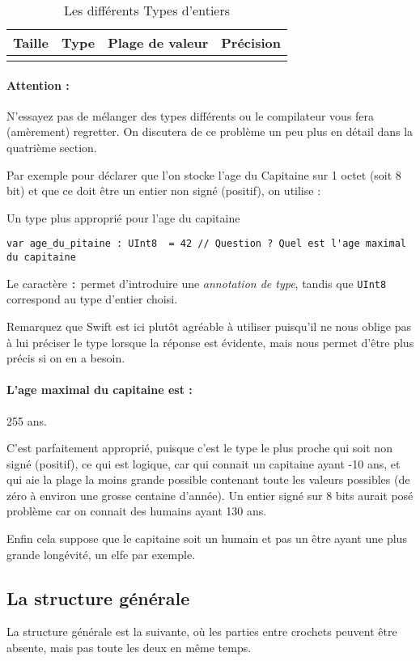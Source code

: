 \begin{longtabu} to \linewidth {|X[3,l,m]|X[1.5,l,m]|X[6,r,m]|X[1,r,m]|}
\hline Taille & Type & Plage de valeur & Précision \\ \hline
\endhead

\caption{Les différents Types d'entiers}
\end{longtabu}

\paragraph{Attention :}
N'essayez pas de mélanger des types différents ou
le compilateur vous fera (amèrement) regretter.
On discutera de ce problème un peu plus en détail dans la quatrième section.

Par exemple pour déclarer que l'on stocke l'age du Capitaine sur 1 octet
(soit 8 bit) et que ce doit être un entier non signé (positif), on utilise :

\begin{listing}[h]
\caption{Un type plus approprié pour l'age du capitaine}
\begin{verbatim}
var age_du_pitaine : UInt8  = 42 // Question ? Quel est l'age maximal du capitaine
\end{verbatim}
\end{listing}
Le caractère \verb":" permet d'introduire une \emph{annotation de type},
tandis que \verb"UInt8" correspond au type d'entier choisi.

Remarquez que Swift est ici plutôt agréable à utiliser puisqu'il ne nous oblige pas à lui préciser le type lorsque la réponse est évidente, mais nous permet d'être plus précis si on en a besoin.
\paragraph{L'age maximal du capitaine est :}
255 ans.

C'est parfaitement approprié, puisque c'est le type le plus proche
qui soit non signé (positif), ce qui est logique,
car qui connait un capitaine ayant -10 ans, et qui aie la plage la moins grande possible contenant toute les valeurs possibles (de zéro à environ une grosse centaine d'année).
Un entier signé sur 8 bits aurait posé problème
car on connait des humains ayant 130 ans.

Enfin cela suppose que le capitaine soit un humain
et pas un être ayant une plus grande longévité, un elfe par exemple.

\subsection{La structure générale}
La structure générale est la suivante,
où les parties entre crochets peuvent être absente,
mais pas toute les deux en même temps.

